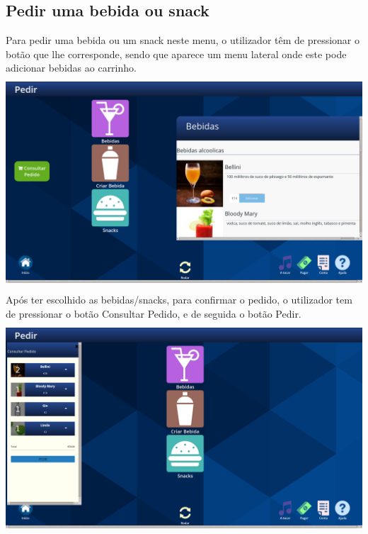 \documentclass{article}
\begin{document}
\subsection{Pedir uma bebida ou snack}
Para pedir uma bebida ou um snack neste menu, o utilizador têm de pressionar o botão que lhe corresponde, sendo que aparece um menu lateral onde este pode adicionar bebidas ao carrinho.\\
\includegraphics[width=15cm, height=8cm]{user_manual_images/drinks_submenu.png} Após ter escolhido as bebidas/snacks, para confirmar o pedido, o utilizador tem de pressionar o botão Consultar Pedido, e de seguida o botão Pedir.\\
\includegraphics[width=15cm, height=8cm]{user_manual_images/ask_order_submenu.png}
\end{document}
